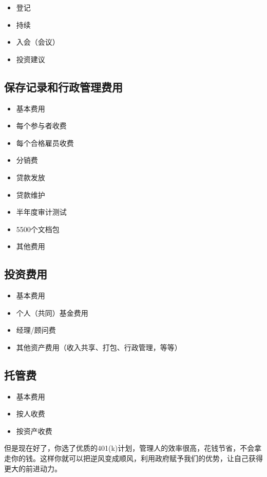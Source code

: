 \begin{itemize}
\item 登记
\item 持续
\item 入会（会议）
\item 投资建议
\end{itemize}

\subsection{保存记录和行政管理费用}

\begin{itemize}
\item 基本费用
\item 每个参与者收费
\item 每个合格雇员收费
\item 分销费
\item 贷款发放
\item 贷款维护
\item 半年度审计测试
\item 5500个文档包
\item 其他费用
\end{itemize}

\subsection{投资费用}

\begin{itemize}
\item 基本费用
\item 个人（共同）基金费用
\item 经理/顾问费
\item 其他资产费用（收入共享、打包、行政管理，等等）
\end{itemize}

\subsection{托管费}

\begin{itemize}
\item 基本费用
\item 按人收费
\item 按资产收费
\end{itemize}

但是现在好了，你选了优质的401(k)计划，管理人的效率很高，花钱节省，不会拿走你的钱。这样你就可以把逆风变成顺风，利用政府赋予我们的优势，让自己获得更大的前进动力。

